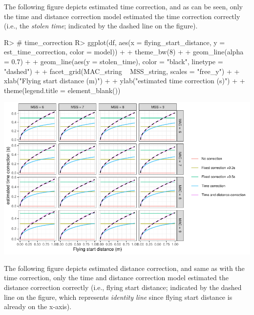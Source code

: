 \documentclass[
]{jss}
\begin{document}
The following figure depicts estimated time correction, and as can be seen, only the time and distance correction model estimated the time correction correctly (i.e., the \emph{stolen time}; indicated by the dashed line on the figure).

\begin{CodeChunk}
\begin{CodeInput}
R> # time_correction
R> ggplot(df, aes(x = flying_start_distance, y = est_time_correction, color = model)) +
+   theme_bw(8) +
+   geom_line(alpha = 0.7) +
+   geom_line(aes(y = stolen_time), color = "black", linetype = "dashed") +
+   facet_grid(MAC_string ~ MSS_string, scales = "free_y") +
+   xlab("Flying start distance (m)") +
+   ylab("estimated time correction (s)") +
+   theme(legend.title = element_blank())
\end{CodeInput}


\begin{center}\includegraphics[width=1\linewidth]{paper_files/figure-latex/unnamed-chunk-38-1} \end{center}

\end{CodeChunk}

The following figure depicts estimated distance correction, and same as with the time correction, only the time and distance correction model estimated the distance correction correctly (i.e., flying start distance; indicated by the dashed line on the figure, which represents \emph{identity line} since flying start distance is already on the x-axis).
\end{document}
